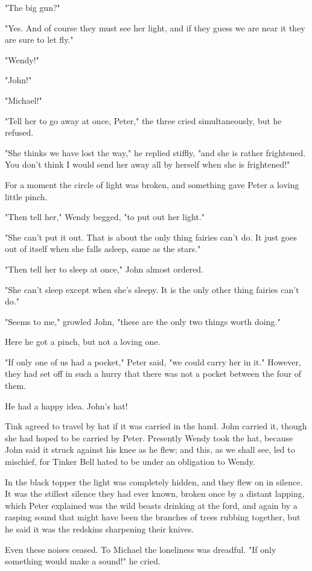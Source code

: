 "The big gun?"

"Yes.
And of course they must see her light, and if they guess we are near it they are sure to let fly."

"Wendy!"

"John!"

"Michael!"

"Tell her to go away at once, Peter," the three cried simultaneously, but he refused.

"She thinks we have lost the way," he replied stiffly, "and she is rather frightened.
You don't think I would send her away all by herself when she is frightened!"

For a moment the circle of light was broken, and something gave Peter a loving little pinch.

"Then tell her," Wendy begged, "to put out her light."

"She can't put it out.
That is about the only thing fairies can't do.
It just goes out of itself when she falls asleep, same as the stars."

"Then tell her to sleep at once," John almost ordered.

"She can't sleep except when she's sleepy.
It is the only other thing fairies can't do."

"Seems to me," growled John, "these are the only two things worth doing."

Here he got a pinch, but not a loving one.

"If only one of us had a pocket," Peter said, "we could carry her in it."
However, they had set off in such a hurry that there was not a pocket between the four of them.

He had a happy idea.
John's hat!

Tink agreed to travel by hat if it was carried in the hand.
John carried it, though she had hoped to be carried by Peter.
Presently Wendy took the hat, because John said it struck against his knee as he flew;
and this, as we shall see, led to mischief, for Tinker Bell hated to be under an obligation to Wendy.

In the black topper the light was completely hidden, and they flew on in silence.
It was the stillest silence they had ever known, broken once by a distant lapping, which Peter explained was the wild beasts drinking at the ford, and again by a rasping sound that might have been the branches of trees rubbing together, but he said it was the redskins sharpening their knives.

Even these noises ceased.
To Michael the loneliness was dreadful.
"If only something would make a sound!\@" he cried.

